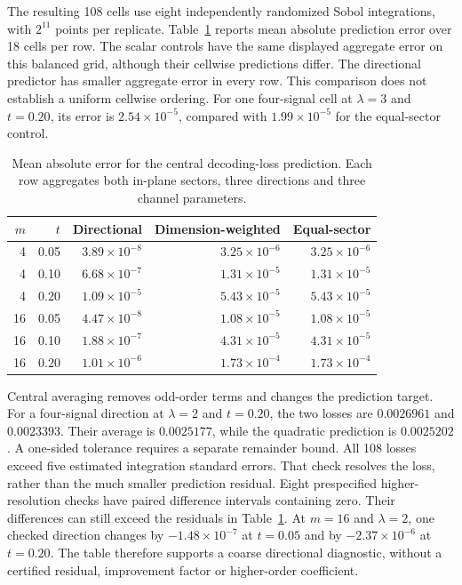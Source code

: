 \documentclass[11pt]{article}
\theoremstyle{remark}\newtheorem{remark}[theorem]{Remark}
\begin{document}
The resulting 108 cells use eight independently randomized Sobol integrations,
with $2^{11}$ points per replicate. Table~\ref{tab:directional} reports mean
absolute prediction error over 18 cells per row.
The scalar controls have the same displayed aggregate error on this balanced
grid, although their cellwise predictions differ.
The directional predictor has smaller aggregate error in every row.
This comparison does not establish a uniform cellwise ordering.
For one four-signal cell at $\lambda=3$ and $t=0.20$, its error is
$2.54\times10^{-5}$, compared with $1.99\times10^{-5}$ for the equal-sector control.

\begin{table}[htbp]
\centering
\caption{Mean absolute error for the central decoding-loss prediction.
Each row aggregates both in-plane sectors, three directions and three channel parameters.}
\label{tab:directional}
\begin{tabular}{rrrrr}
\toprule
$m$ & $t$ & Directional & Dimension-weighted & Equal-sector\\
\midrule
4 & 0.05 & $3.89\times10^{-8}$ & $3.25\times10^{-6}$ & $3.25\times10^{-6}$\\
4 & 0.10 & $6.68\times10^{-7}$ & $1.31\times10^{-5}$ & $1.31\times10^{-5}$\\
4 & 0.20 & $1.09\times10^{-5}$ & $5.43\times10^{-5}$ & $5.43\times10^{-5}$\\
16 & 0.05 & $4.47\times10^{-8}$ & $1.08\times10^{-5}$ & $1.08\times10^{-5}$\\
16 & 0.10 & $1.88\times10^{-7}$ & $4.31\times10^{-5}$ & $4.31\times10^{-5}$\\
16 & 0.20 & $1.01\times10^{-6}$ & $1.73\times10^{-4}$ & $1.73\times10^{-4}$\\
\bottomrule
\end{tabular}
\end{table}

Central averaging removes odd-order terms and changes the prediction target.
For a four-signal direction at $\lambda=2$ and $t=0.20$, the two losses are
$0.0026961$ and $0.0023393$. Their average is $0.0025177$, while the quadratic
prediction is $0.0025202$. A one-sided tolerance requires a separate remainder bound.
All 108 losses exceed five estimated integration standard errors.
That check resolves the loss, rather than the much smaller prediction residual.
Eight prespecified higher-resolution checks have paired difference intervals
containing zero. Their differences can still exceed the residuals in
Table~\ref{tab:directional}. At $m=16$ and $\lambda=2$, one checked direction
changes by $-1.48\times10^{-7}$ at $t=0.05$ and by $-2.37\times10^{-6}$ at $t=0.20$.
The table therefore supports a coarse directional diagnostic, without a
certified residual, improvement factor or higher-order coefficient.
\end{document}
